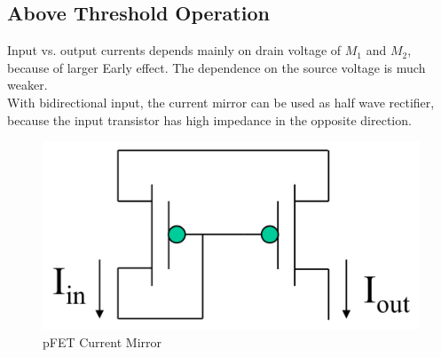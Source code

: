 \documentclass[main]{subfiles}
\begin{document}
\subsection{Above Threshold Operation}
Input vs. output currents depends mainly on drain voltage of $M_1$ and $M_2$, because of larger Early effect. The dependence on the source voltage is much weaker.\\
With bidirectional input, the current mirror can be used as half wave rectifier, because the input transistor has high impedance in the opposite direction.

\begin{figure}[htbp]
  \centering
  \includegraphics[scale=0.5]{figs/current_mirror_pfet.png}
  \caption{pFET Current Mirror \cite{lec4}}
  \label{fig:pFET_Current_Mirror}
\end{figure}\bigskip
\end{document}
